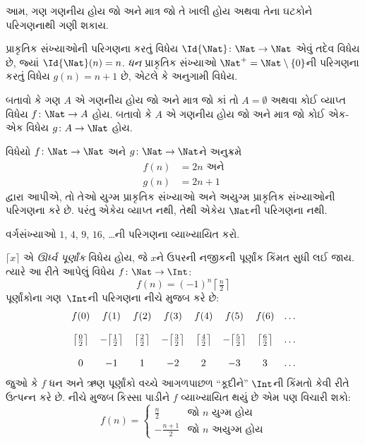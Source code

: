 \begin{explain}
આમ, ગણ ગણનીય હોય જો અને માત્ર જો તે ખાલી હોય અથવા તેના
ઘટકોને પરિગણનાથી ગણી શકાય.
\end{explain}

\begin{ex}
પ્રાકૃતિક સંખ્યાઓની પરિગણના કરતું વિધેય
$\Id{\Nat} \colon \Nat \to \Nat$ એવું તદેવ વિધેય છે, જ્યાં
$\Id{\Nat}(n) = n$. \emph{ધન} પ્રાકૃતિક સંખ્યાઓ
$\Nat^+ = \Nat \setminus \{0\}$ની પરિગણના કરતું વિધેય
$g(n) = n + 1$ છે, એટલે કે અનુગામી વિધેય.
\end{ex}

\begin{prob}
બતાવો કે ગણ $A$ એ ગણનીય હોય જો અને માત્ર જો કાં તો
$A = \emptyset$ અથવા કોઈ વ્યાપ્ત વિધેય $f\colon \Nat \to A$ હોય.
બતાવો કે $A$ એ ગણનીય હોય જો અને માત્ર જો કોઈ
એક-એક વિધેય $g\colon A \to \Nat$ હોય.
\end{prob}

\begin{ex}
વિધેયો $f\colon \Nat \to \Nat$ અને $g \colon \Nat \to \Nat$ને
અનુક્રમે
\begin{align*}
  f(n) & = 2n \text{ અને}\\
  g(n) & = 2n+1
\end{align*}
દ્વારા આપીએ, તો તેઓ યુગ્મ પ્રાકૃતિક સંખ્યાઓ અને અયુગ્મ પ્રાકૃતિક
સંખ્યાઓની પરિગણના કરે છે. પરંતુ એકેય વ્યાપ્ત નથી, તેથી
એકેય $\Nat$ની પરિગણના નથી.
\end{ex}

\begin{prob}
વર્ગસંખ્યાઓ $1$, $4$, $9$, $16$, \dots{}ની પરિગણના વ્યાખ્યાયિત કરો.
\end{prob}

\begin{ex}
$\lceil x \rceil$ એ \emph{ઊર્ધ્વ પૂર્ણાંક} વિધેય હોય, જે $x$ને
ઉપરની નજીકની પૂર્ણાંક કિંમત સુધી લઈ જાય. ત્યારે આ રીતે આપેલું
વિધેય $f \colon \Nat \to \Int$:
\[
  f(n) = (-1)^{n} \left\lceil\tfrac{n}{2}\right\rceil
\]
પૂર્ણાંકોના ગણ~$\Int$ની પરિગણના નીચે મુજબ કરે છે:
\[
\begin{array}{c c c c c c c c}
f(0) & f(1) & f(2) & f(3) & f(4) & f(5) & f(6) & \dots \\ \\
\big\lceil \tfrac{0}{2} \big\rceil & -\big\lceil \tfrac{1}{2}\big\rceil &  \big\lceil \tfrac{2}{2} \big\rceil & -\big\lceil \tfrac{3}{2} \big\rceil & \big\lceil \tfrac{4}{2} \big\rceil  & -\big\lceil \tfrac{5}{2}\big\rceil & \big\lceil \tfrac{6}{2} \big\rceil & \dots \\ \\
0 & -1 & 1 & -2 & 2 & -3 & 3& \dots
\end{array}
\]
જુઓ કે $f$ ધન અને ઋણ પૂર્ણાંકો વચ્ચે આગળપાછળ “કૂદીને” $\Int$ની
કિંમતો કેવી રીતે ઉત્પન્ન કરે છે. નીચે મુજબ કિસ્સા પાડીને $f$
વ્યાખ્યાયિત થયું છે એમ પણ વિચારી શકો:
\[
f(n) = \begin{cases}
  \frac{n}{2} & \text{જો $n$ યુગ્મ હોય}\\
  -\frac{n+1}{2} & \text{જો $n$ અયુગ્મ હોય}
  \end{cases}
\]
\end{ex}

